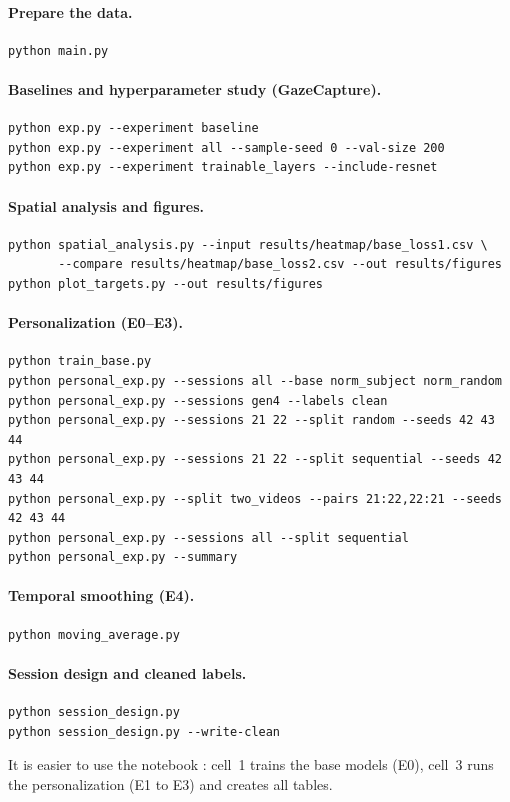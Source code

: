 \paragraph{Prepare the data.}
\begin{verbatim}
python main.py
\end{verbatim}

\paragraph{Baselines and hyperparameter study (GazeCapture).}
\begin{verbatim}
python exp.py --experiment baseline
python exp.py --experiment all --sample-seed 0 --val-size 200
python exp.py --experiment trainable_layers --include-resnet
\end{verbatim}

\paragraph{Spatial analysis and figures.}
\begin{verbatim}
python spatial_analysis.py --input results/heatmap/base_loss1.csv \
       --compare results/heatmap/base_loss2.csv --out results/figures
python plot_targets.py --out results/figures
\end{verbatim}

\paragraph{Personalization (E0--E3).}
\begin{verbatim}
python train_base.py
python personal_exp.py --sessions all --base norm_subject norm_random
python personal_exp.py --sessions gen4 --labels clean
python personal_exp.py --sessions 21 22 --split random --seeds 42 43 44
python personal_exp.py --sessions 21 22 --split sequential --seeds 42 43 44
python personal_exp.py --split two_videos --pairs 21:22,22:21 --seeds 42 43 44
python personal_exp.py --sessions all --split sequential
python personal_exp.py --summary
\end{verbatim}

\paragraph{Temporal smoothing (E4).}
\begin{verbatim}
python moving_average.py
\end{verbatim}

\paragraph{Session design and cleaned labels.}
\begin{verbatim}
python session_design.py
python session_design.py --write-clean
\end{verbatim}

It is easier to use the notebook : cell~1 trains the
base models (E0), cell~3 runs the personalization (E1 to E3) and creates all
tables.
